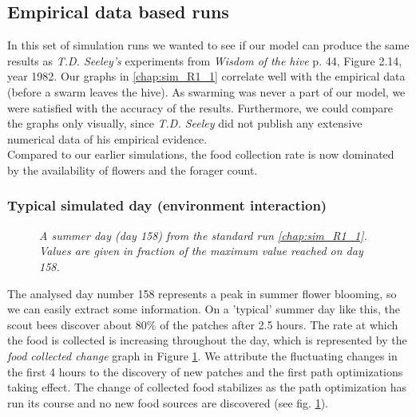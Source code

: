 \subsection{Empirical data based runs}
	In this set of simulation runs we wanted to see if our model can produce the same results as \textit{T.D. Seeley's} experiments from \textit{Wisdom of the hive} p. 44, Figure  2.14, year 1982. Our graphs in \ref{chap:sim_R1_1} correlate well with the empirical data (before a swarm leaves the hive). As swarming was never a part of our model, we were satisfied with the accuracy of the results. Furthermore, we could compare the graphs only visually, since \textit{T.D. Seeley} did not publish any  extensive numerical data of his empirical evidence.\\
	Compared to our earlier simulations, the food collection rate is now dominated by the availability of flowers and the forager count.
	
	\subsubsection{Typical simulated day (environment interaction)}
	
					\begin{figure}[H]
						\centering
						\caption{\textit{A summer day (day 158) from the standard run \ref{chap:sim_R1_1}. Values are given in fraction of the maximum value reached on day 158.}}
						\label{fig:day158}
					\end{figure}
					
		The analysed day number 158 represents a peak in summer flower blooming, so we can easily extract some information. On a 'typical' summer day like this, the scout bees discover about $80\%$ of the patches after 2.5 hours. The rate at which the food is collected is increasing throughout the day, which is represented by the \textit{food collected change} graph in Figure \ref{fig:day158}. We attribute the fluctuating changes in the first 4 hours to the discovery of new patches and the first path optimizations taking effect. The change of collected food stabilizes as the path optimization has run its course and no new food sources are discovered (see fig. \ref{fig:day158}).\\
		
